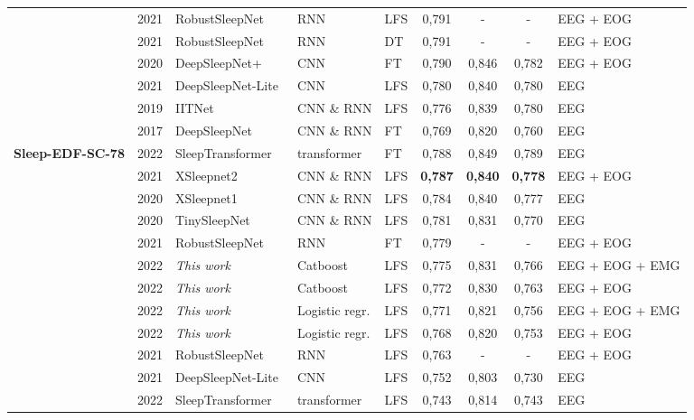 \documentclass[runningheads]{llncs}
\begin{document}
\begin{table}[htbp]
{\begin{tabular}{c|p{}p{}p{}p{}|ccc|l}
 & 2021 & RobustSleepNet~\cite{guillot2021robustsleepnet} & RNN & LFS & 0,791 & - & - & EEG + EOG \\
 & 2021 & RobustSleepNet~\cite{guillot2021robustsleepnet} & RNN & DT & 0,791 & - & - & EEG + EOG \\
 & 2020 & DeepSleepNet+~\cite{phan2020towards} & CNN & FT & 0,790 & 0,846 & 0,782 & EEG + EOG \\
 & 2021 & DeepSleepNet-Lite~\cite{fiorillo2021deepsleepnetlite} & CNN & LFS & 0,780 & 0,840 & 0,780 & EEG \\
 & 2019 & IITNet~\cite{seo2020iitnet} & CNN \& RNN & LFS & 0,776 & 0,839 & 0,780 & EEG \\
 & 2017 & DeepSleepNet~\cite{supratak2017deepsleepnet} & CNN \& RNN & FT & 0,769 & 0,820 & 0,760 & EEG \\
\midrule
\multirow{14}{*}{\textbf{Sleep-EDF-SC-78}} & 2022 & SleepTransformer~\cite{phan2022sleeptransformer} & transformer & FT & 0,788 & 0,849 & 0,789 & EEG \\
 & 2021 & XSleepnet2~\cite{phan2021xsleepnet} & CNN \& RNN & LFS & \textbf{0,787} & \textbf{0,840} & \textbf{0,778} & EEG + EOG \\
 & 2020 & XSleepnet1~\cite{phan2021xsleepnet} & CNN \& RNN & LFS & 0,784 & 0,840 & 0,777 & EEG \\
 & 2020 & TinySleepNet~\cite{supratak2020tinysleepnet} & CNN \& RNN & LFS & 0,781 & 0,831 & 0,770 & EEG \\
 & 2021 & RobustSleepNet~\cite{guillot2021robustsleepnet} & RNN & FT & 0,779 & - & - & EEG + EOG \\
 & 2022 & \textit{This work} & Catboost & LFS & 0,775 & 0,831 & 0,766 & EEG + EOG + EMG \\
 & 2022 & \textit{This work} & Catboost & LFS & 0,772 & 0,830 & 0,763 & EEG + EOG \\
 & 2022 & \textit{This work} & Logistic regr. & LFS & 0,771 & 0,821 & 0,756 & EEG + EOG + EMG \\
 & 2022 & \textit{This work} & Logistic regr. & LFS & 0,768 & 0,820 & 0,753 & EEG + EOG \\
 & 2021 & RobustSleepNet~\cite{guillot2021robustsleepnet} & RNN & LFS & 0,763 & - & - & EEG + EOG \\
 & 2021 & DeepSleepNet-Lite~\cite{fiorillo2021deepsleepnetlite} & CNN & LFS & 0,752 & 0,803 & 0,730 & EEG \\
 & 2022 & SleepTransformer~\cite{phan2022sleeptransformer} & transformer & LFS & 0,743 & 0,814 & 0,743 & EEG \\

\end{tabular}}
\end{table}
\end{document}
